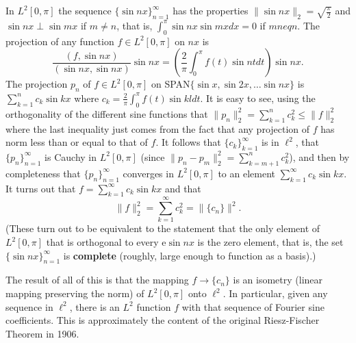 \begin{rmk}
	In $L^2[0,\pi]$ the sequence $\{\sin nx\}_{n=1}^\infty$ has the properties 
	$\|\sin nx\|_2 = \sqrt{\frac{\pi}{2}}$ and $\sin nx \perp \sin mx$ if $m \neq n$, that is, 
	$\int_0^\pi \sin nx \sin mx dx = 0$ if $m neq n$. The projection of any function $f \in L^2[0,\pi]$ 
	on $nx$ is 
	\begin{equation*}
		\frac{(f,\sin nx)}{(\sin nx, \sin nx)}\sin nx = 
		\left(\frac{2}{\pi}\int_0^\pi f(t) \sin nt dt\right)\sin nx. 
	\end{equation*}
	The projection $p_n$ of $f \in L^2[0,\pi]$ on SPAN$\{\sin x, \sin 2x, \dots \sin nx\}$ is 
	$\sum\limits_{k=1}^n c_k\sin kx$ where $c_k = \frac{2}{\pi}\int_0^\pi f(t) \sin kl dt$. It is 
	easy to see, using the orthogonality of the different sine functions that $\|p_n\|_2^2 = 
	\sum\limits_{k=1}^nc_k^2 \le \|f\|_2^2$ where the last inequality just comes from the fact that 
	any projection of $f$ has norm less than or equal to that of $f$. It follows that $\{c_k\}_{k=1}^\infty$ 
	is in $\ell^2$, that $\{p_n\}_{n=1}^\infty$ is Cauchy in $L^2[0,\pi]$ (since $\|p_n - p_m\|_2^2 = 
	\sum\limits_{k=m+1}^nc_k^2$), and then by completeness that $\{p_n\}_{n=1}^\infty$ converges 
	in $L^2[0,\pi]$ to an element $\sum\limits_{k=1}^\infty c_k\sin kx$. It turns out that 
	$f = \sum\limits_{k=1}^\infty c_k \sin kx$ and that 
	\begin{equation*}
		\|f\|_2^2 = \sum\limits_{k=1}^\infty c_k^2  = \|\{c_n\}\|^2. 
	\end{equation*}
	(These turn out to be equivalent to the statement that the only element of $L^2[0,\pi]$ that 
	is orthogonal to every e$\sin nx$ is the zero element, that is, the set $\{\sin nx\}_{n=1}^\infty$ 
	is \textbf{complete} (roughly, large enough to function as a basis).)

	The result of all of this is that the mapping $f\rightarrow \{c_n\}$ is an isometry (linear 
	mapping preserving the norm) of $L^2[0,\pi]$ onto $\ell^2$. In particular, given any 
	sequence in $\ell^2$, there is an $L^2$ function $f$ with that sequence of Fourier sine coefficients. 
	This is approximately the content of the original Riesz-Fischer Theorem in 1906.
\end{rmk}
